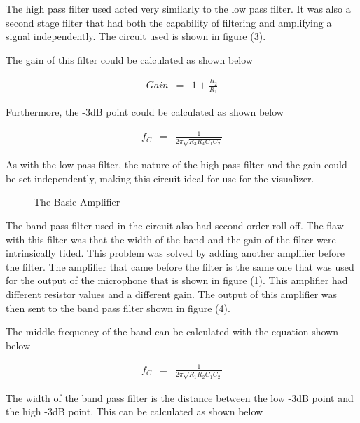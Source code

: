 \documentclass{article}
\begin{document}
The high pass filter used acted very similarly to the low pass filter. It was also a second stage filter that had both the capability of filtering and amplifying a signal independently. The circuit used is shown in figure (3).%

The gain of this filter could be calculated as shown below%

\begin{eqnarray}
Gain &=& 1 + \frac{R_2}{R_1} 
\end{eqnarray}

Furthermore, the -3dB point could be calculated as shown below%

\begin{eqnarray}
f_C &=& \frac{1}{2\pi \sqrt{R_3R_4C_1C_2}}
\end{eqnarray}

As with the low pass filter, the nature of the high pass filter and the gain could be set independently, making this circuit ideal for use for the visualizer.

\begin{figure}
\begin{minipage}[b]{1.0\linewidth}
  \centering
  \centerline{}
\caption{The Basic Amplifier}
\end{minipage}

\end{figure}

The band pass filter used in the circuit also had second order roll off. The flaw with this filter was that the width of the band and the gain of the filter were intrinsically tided. This problem was solved by adding another amplifier before the filter. The amplifier that came before the filter is the same one that was used for the output of the microphone that is shown in figure (1). This amplifier had different resistor values and a different gain. The output of this amplifier was then sent to the band pass filter shown in figure (4).%



The middle frequency of the band can be calculated with the equation shown below%

\begin{eqnarray}
f_C &=& \frac{1}{2\pi \sqrt{R_1R_2C_1C_2}}
\end{eqnarray}

The width of the band pass filter is the distance between the low -3dB point and the high -3dB point. This can be calculated as shown below%
\end{document}
